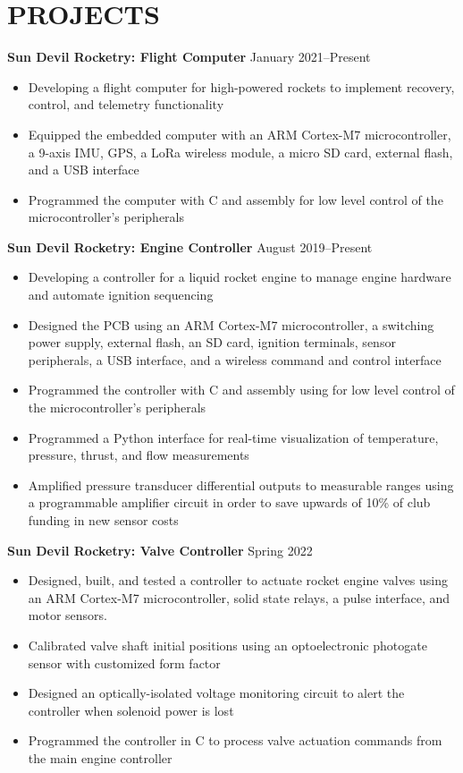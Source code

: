 \documentclass{article}
\begin{document}
\section{PROJECTS}
\textbf{Sun Devil Rocketry: Flight Computer}
\hfill
\vspace{0.5em}
January 2021--Present
\begin{itemize}
\item{Developing a flight computer for high-powered rockets to implement recovery, control, and telemetry functionality}
\item{Equipped the embedded computer with an ARM Cortex-M7 microcontroller, a 9-axis IMU, GPS, a LoRa wireless module, a micro SD card, external flash, and a USB interface}
\item{Programmed the computer with C and assembly for low level control of the microcontroller's peripherals}
\end{itemize}
\vspace{1em}
\textbf{Sun Devil Rocketry: Engine Controller}
\hfill
\vspace{0.5em}
August 2019--Present
\begin{itemize}
\item{Developing a controller for a liquid rocket engine to manage engine hardware and automate ignition sequencing}
\item{Designed the PCB using an ARM Cortex-M7 microcontroller, a switching power supply, external flash, an SD card, ignition terminals, sensor peripherals, a USB interface, and a wireless command and control interface}
\item{Programmed the controller with C and assembly using for low level control of the microcontroller's peripherals}
\item{Programmed a Python interface for real-time visualization of temperature, pressure, thrust, and flow measurements}
\item{Amplified pressure transducer differential outputs to measurable ranges using a programmable amplifier circuit in order to save upwards of 10\% of club funding in new sensor costs}
\end{itemize}
\vspace{1em}
\textbf{Sun Devil Rocketry: Valve Controller}
\hfill
\vspace{0.5em}
Spring 2022
\begin{itemize}
\item{Designed, built, and tested a controller to actuate rocket engine valves using an ARM Cortex-M7 microcontroller, solid state relays, a pulse interface, and motor sensors.}
\item{Calibrated valve shaft initial positions using an optoelectronic photogate sensor with customized form factor}
\item{Designed an optically-isolated voltage monitoring circuit to alert the controller when solenoid power is lost}
\item{Programmed the controller in C to process valve actuation commands from the main engine controller}
\end{itemize}
\thispagestyle{empty}
\thispagestyle{empty}
\end{document}
